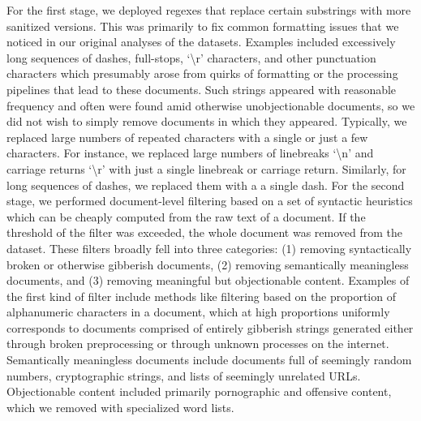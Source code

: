 \documentclass{article}
\begin{document}
For the first stage, we deployed regexes that replace certain substrings with more sanitized versions. This was primarily to fix common formatting issues that we noticed in our original analyses of the datasets. Examples included excessively long sequences of dashes, full-stops, `\textbackslash r' characters, and other punctuation characters which presumably arose from quirks of formatting or the processing pipelines that lead to these documents. Such strings appeared with reasonable frequency and often were found amid otherwise unobjectionable documents, so we did not wish to simply remove documents in which they appeared. Typically, we replaced large numbers of repeated characters with a single or just a few characters. 
For instance, we replaced large numbers of linebreaks `\textbackslash n' and carriage returns `\textbackslash r' with just a single linebreak or carriage return. Similarly, for long sequences of dashes, we replaced them with a a single dash.
For the second stage, we performed document-level filtering based on a set of syntactic heuristics which can be cheaply computed from the raw text of a document.
If the threshold of the filter was exceeded, the whole document was removed from the dataset. These filters broadly fell into three categories: (1) removing syntactically broken or otherwise gibberish documents, (2) removing semantically meaningless documents, and (3) removing meaningful but objectionable content. Examples of the first kind of filter include methods like filtering based on the proportion of alphanumeric characters in a document, which at high proportions uniformly corresponds to documents comprised of entirely gibberish strings generated either through broken preprocessing or through unknown processes on the internet. Semantically meaningless documents include documents full of seemingly random numbers, cryptographic strings, and lists of seemingly unrelated URLs. Objectionable content included primarily pornographic and offensive content, which we removed with specialized word lists.
\end{document}
